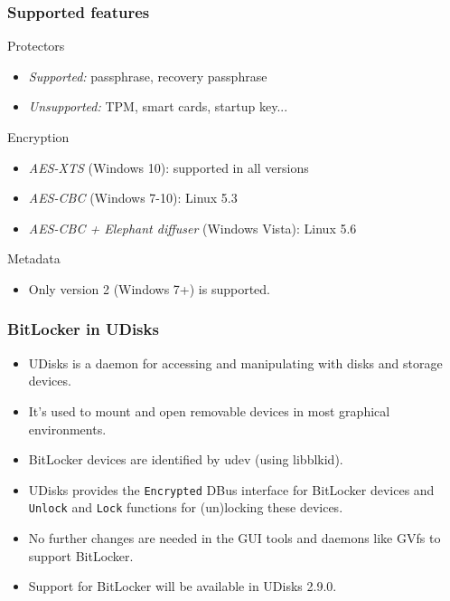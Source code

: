 \documentclass{beamer}
\begin{document}
\begin{frame}
	\frametitle{Supported features}
	
	\begin{block}{Protectors}
		\begin{itemize}
			\item \emph{Supported:} passphrase, recovery passphrase
			\item \emph{Unsupported:} TPM, smart cards, startup key...
		\end{itemize}
	\end{block}

	\begin{block}{Encryption}
		\begin{itemize}
			\item \emph{AES-XTS} (Windows 10): supported in all versions
			\item \emph{AES-CBC} (Windows 7-10): Linux 5.3
			\item \emph{AES-CBC + Elephant diffuser} (Windows Vista): Linux 5.6
		\end{itemize}
	\end{block}

	\begin{block}{Metadata}
		\begin{itemize}
			\item Only version 2 (Windows 7+) is supported.
		\end{itemize}
	\end{block}
\end{frame}

\begin{frame}
	\frametitle{BitLocker in UDisks}
	\begin{itemize}
		\item UDisks is a daemon for accessing and manipulating with disks and storage devices.
		\item It's used to mount and open removable devices in most graphical environments.
		\item BitLocker devices are identified by udev (using libblkid\footnotemark).
		\item UDisks provides the \texttt{Encrypted} DBus interface for BitLocker devices and \texttt{Unlock} and \texttt{Lock} functions for (un)locking these devices.
		\item No further changes are needed in the GUI tools and daemons like GVfs to support BitLocker.
		\item Support for BitLocker will be available in UDisks 2.9.0.
	\end{itemize}

\end{frame}
\end{document}
